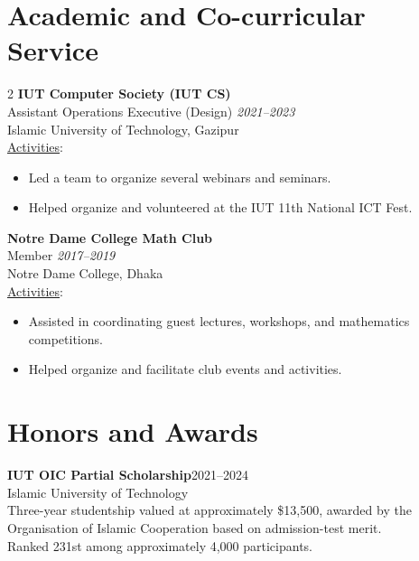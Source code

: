 \documentclass[10pt,letterpaper]{article}
\newcommand{\entry}[3]{%
    \textbf{#1}\hfill #2\\[-1pt]
    #3
}
\newenvironment{cvitems}{%
    \begin{itemize}[
        leftmargin=13pt,
        topsep=2pt,
        itemsep=1pt,
        parsep=0pt,
        partopsep=0pt
    ]
}{\end{itemize}}
\begin{document}
\section{Academic and Co-curricular Service}
\vspace{-\baselineskip}
\setlength{\columnsep}{20pt}
\begin{multicols}{2}
    \textbf{IUT Computer Society (IUT CS)}\\[-1pt]
    Assistant Operations Executive (Design) \hfill \textit{2021--2023}\\[-1pt]
    Islamic University of Technology, Gazipur\\[-1pt]
    \underline{Activities}:
    \begin{cvitems}
        \item Led a team to organize several webinars and seminars.
        \item Helped organize and volunteered at the IUT 11th National ICT Fest.
    \end{cvitems}

    \columnbreak

    \textbf{Notre Dame College Math Club}\\[-1pt]
    Member \hfill \textit{2017--2019}\\[-1pt]
    Notre Dame College, Dhaka\\[-1pt]
    \underline{Activities}:
    \begin{cvitems}
        \item Assisted in coordinating guest lectures, workshops, and mathematics competitions.
        \item Helped organize and facilitate club events and activities.
    \end{cvitems}
\end{multicols}

\section{Honors and Awards}
\entry{IUT OIC Partial Scholarship}{2021--2024}{%
    Islamic University of Technology\\[-1pt]
    Three-year studentship valued at approximately \$13,500, awarded by the Organisation of Islamic Cooperation based on admission-test merit. \\
    Ranked 231st among approximately 4,000 participants.
}
\end{document}
